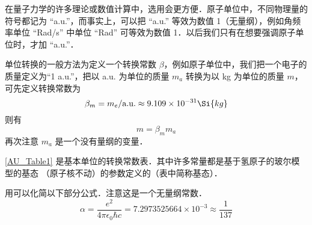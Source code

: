 

在量子力学的许多理论或数值计算中，选用会更方便．原子单位中，不同物理量的符号都记为 “a.u.”，而事实上，可以把 “a.u.” 等效为数值 1（无量纲），例如角频率单位 “Rad/s” 中单位 “Rad” 可等效为数值 1．以后我们只有在想要强调原子单位时，才加 “a.u.”．

单位转换的一般方法为定义一个转换常数 $\beta$，例如原子单位中，我们把一个电子的质量定义为“1 a.u.”，把以 a.u. 为单位的质量 $m_a$ 转换为以 kg 为单位的质量 $m$，可先定义转换常数为
\begin{equation}
\beta_m = m_e/\text{a.u.} \approx 9.109 \times 10^{-31}\Si{kg}
\end{equation}
则有
\begin{equation}
m = \beta_m m_a
\end{equation}
再次注意 $m_a$ 是一个没有量纲的变量．

\autoref{AU_Table1} %
是基本单位的转换常数表．其中许多常量都是基于氢原子的玻尔模型的基态%
（原子核不动）的参数定义的（表中简称基态）．

用可以化简以下部分公式．注意这是一个无量纲常数．
\begin{equation}
\alpha  = \frac{e^2}{4\pi\epsilon_0\hbar c} = 7.2973525664 \times 10^{-3} \approx \frac{1}{137}
\end{equation}

